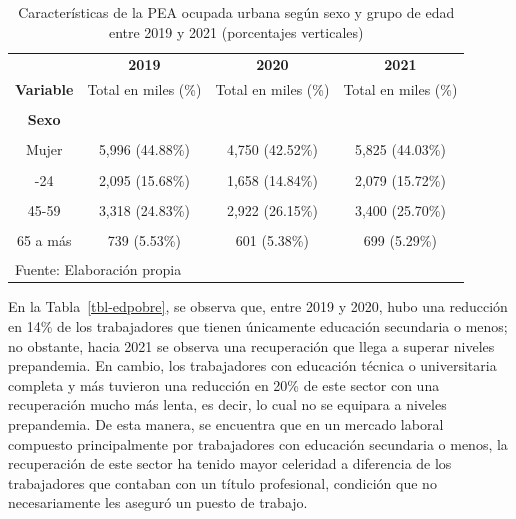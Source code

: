 \documentclass[
  letterpaper,
  12pt,
  oneside,
  spanish,
  doublespacing,
  headsepline,
  parskip]{MastersDoctoralThesis}
\begin{document}
\hypertarget{tbl-peasexeda}{}
\begin{table}[H]
\caption{\label{tbl-peasexeda}Características de la PEA ocupada urbana según sexo y grupo de edad
entre 2019 y 2021 (porcentajes verticales) }\tabularnewline

\centering\begingroup\fontsize{10}{12}\selectfont

\begin{tabular}{cccc}
\toprule
\multicolumn{1}{c}{ } & \multicolumn{1}{c}{\textbf{2019}} & \multicolumn{1}{c}{\textbf{2020}} & \multicolumn{1}{c}{\textbf{2021}} \\
\cmidrule(l{3pt}r{3pt}){2-2} \cmidrule(l{3pt}r{3pt}){3-3} \cmidrule(l{3pt}r{3pt}){4-4}
\textbf{Variable} & Total en miles (\%) & Total en miles (\%) & Total en miles (\%)\\
\midrule
\cellcolor{gray!6}{\textbf{Nacional}} & \cellcolor{gray!6}{13,360 (100.00\%)} & \cellcolor{gray!6}{11,172 (100.00\%)} & \cellcolor{gray!6}{13,229 (100.00\%)}\\
\textbf{Sexo} &  &  & \\
\cellcolor{gray!6}{Hombre} & \cellcolor{gray!6}{7,364 (55.12\%)} & \cellcolor{gray!6}{6,421 (57.48\%)} & \cellcolor{gray!6}{7,405 (55.97\%)}\\
Mujer & 5,996 (44.88\%) & 4,750 (42.52\%) & 5,825 (44.03\%)\\
\cellcolor{gray!6}{\textbf{Grupos de edad}} & \cellcolor{gray!6}{} & \cellcolor{gray!6}{} & \cellcolor{gray!6}{}\\
\addlinespace
14-24 & 2,095 (15.68\%) & 1,658 (14.84\%) & 2,079 (15.72\%)\\
\cellcolor{gray!6}{25-44} & \cellcolor{gray!6}{6,442 (48.21\%)} & \cellcolor{gray!6}{5,445 (48.74\%)} & \cellcolor{gray!6}{6,421 (48.53\%)}\\
45-59 & 3,318 (24.83\%) & 2,922 (26.15\%) & 3,400 (25.70\%)\\
\cellcolor{gray!6}{60-64} & \cellcolor{gray!6}{767 (5.74\%)} & \cellcolor{gray!6}{546 (4.89\%)} & \cellcolor{gray!6}{630 (4.76\%)}\\
65 a más & 739 (5.53\%) & 601 (5.38\%) & 699 (5.29\%)\\
\bottomrule
\multicolumn{4}{l}{\textsuperscript{} Fuente: Elaboración propia}\\
\end{tabular}
\endgroup{}
\end{table}

En la Tabla~\ref{tbl-edpobre}, se observa que, entre 2019 y 2020, hubo
una reducción en 14\% de los trabajadores que tienen únicamente
educación secundaria o menos; no obstante, hacia 2021 se observa una
recuperación que llega a superar niveles prepandemia. En cambio, los
trabajadores con educación técnica o universitaria completa y más
tuvieron una reducción en 20\% de este sector con una recuperación mucho
más lenta, es decir, lo cual no se equipara a niveles prepandemia. De
esta manera, se encuentra que en un mercado laboral compuesto
principalmente por trabajadores con educación secundaria o menos, la
recuperación de este sector ha tenido mayor celeridad a diferencia de
los trabajadores que contaban con un título profesional, condición que
no necesariamente les aseguró un puesto de trabajo.
\end{document}
